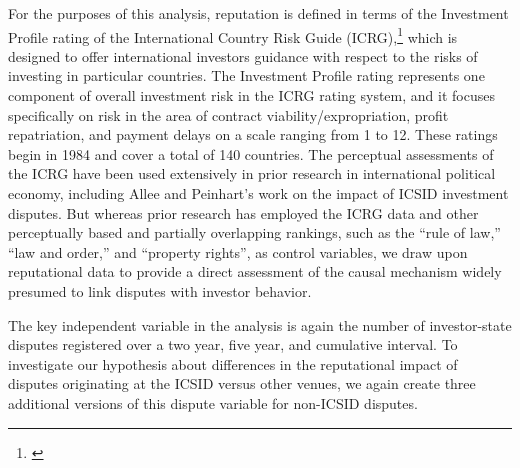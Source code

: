 \documentclass[12pt,onesided]{amsart}
\begin{document}
For the purposes of this analysis, reputation is defined in terms of the Investment Profile rating of the International Country Risk Guide (ICRG),\footnote{\citet{prs:2013}} which is designed to offer international investors guidance with respect to the risks of investing in particular countries. The Investment Profile rating represents one component of overall investment risk in the ICRG rating system, and it focuses specifically on risk in the area of contract viability/expropriation, profit repatriation, and payment delays on a scale ranging from 1 to 12. These ratings begin in 1984 and cover a total of 140 countries. The perceptual assessments of the ICRG have been used extensively in prior research in international political economy, including Allee and Peinhart's work on the impact of ICSID investment disputes. But whereas prior research has employed the ICRG data and other perceptually based and partially overlapping rankings, such as the ``rule of law,'' ``law and order,'' and ``property rights'', as control variables, we draw upon reputational data to provide a direct assessment of the causal mechanism widely presumed to link disputes with investor behavior.

The key independent variable in the analysis is again the number of investor-state disputes registered over a two year, five year, and cumulative interval. To investigate our hypothesis about differences in the reputational impact of disputes originating at the ICSID versus other venues, we again create three additional versions of this dispute variable for non-ICSID disputes.
\end{document}
